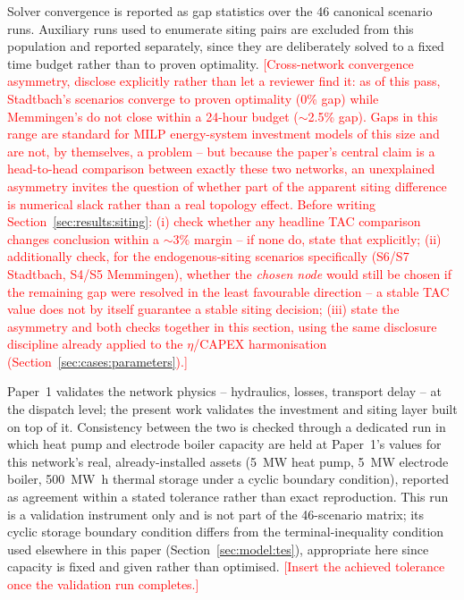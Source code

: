 \documentclass[review,3p]{elsarticle}
\newcommand{\placeholder}[1]{\textcolor{red}{[#1]}}
\begin{document}
Solver convergence is reported as gap statistics over the
\num{46} canonical scenario runs. Auxiliary runs used to enumerate
siting pairs are excluded from this population and reported separately,
since they are deliberately solved to a fixed time budget rather than to
proven optimality.
\placeholder{Cross-network convergence asymmetry, disclose explicitly
rather than let a reviewer find it: as of this pass, Stadtbach's
scenarios converge to proven optimality (0\% gap) while Memmingen's do
not close within a 24-hour budget (${\sim}$2.5\% gap). Gaps in this
range are standard for MILP energy-system investment models of this
size and are not, by themselves, a problem -- but because the paper's
central claim is a head-to-head comparison between exactly these two
networks, an unexplained asymmetry invites the question of whether part
of the apparent siting difference is numerical slack rather than a real
topology effect. Before writing Section~\ref{sec:results:siting}: (i)
check whether any headline TAC comparison changes conclusion within a
${\sim}$3\% margin -- if none do, state that explicitly; (ii)
additionally check, for the endogenous-siting scenarios specifically
(S6/S7 Stadtbach, S4/S5 Memmingen), whether the \emph{chosen node}
would still be chosen if the remaining gap were resolved in the least
favourable direction -- a stable TAC value does not by itself guarantee
a stable siting decision; (iii) state the asymmetry and both checks
together in this section, using the same disclosure discipline already
applied to the $\eta$/CAPEX harmonisation
(Section~\ref{sec:cases:parameters}).}

Paper~1 validates the network physics -- hydraulics, losses, transport
delay -- at the dispatch level; the present work validates the
investment and siting layer built on top of it. Consistency between the
two is checked through a dedicated run in which heat pump and electrode
boiler capacity are held at Paper~1's values for this network's real,
already-installed assets (\SI{5}{\mega\watt} heat pump,
\SI{5}{\mega\watt} electrode boiler, \SI{500}{\mega\watt\hour} thermal
storage under a cyclic boundary condition), reported as agreement within
a stated tolerance rather than exact reproduction. This run is a
validation instrument only and is not part of the \num{46}-scenario
matrix; its cyclic storage boundary condition differs from the
terminal-inequality condition used elsewhere in this paper
(Section~\ref{sec:model:tes}), appropriate here since capacity is fixed
and given rather than optimised.
\placeholder{Insert the achieved tolerance once the validation run
completes.}
\end{document}

